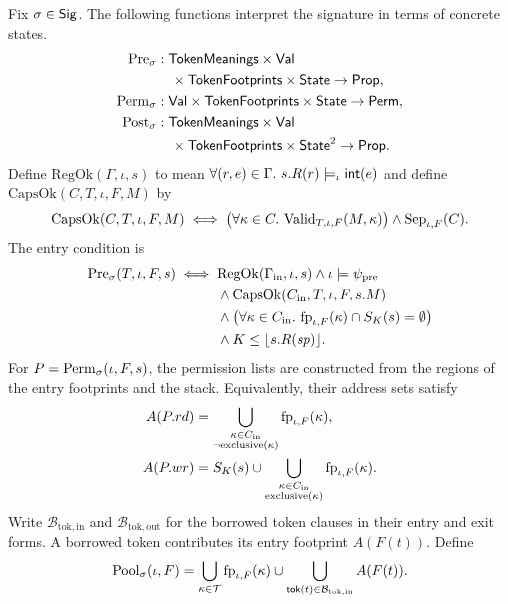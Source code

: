 \begin{definition}\label{def:prepost}
Fix $\sigma\in\mathsf{Sig}$. The following functions interpret the signature in terms of concrete states.
\[
\begin{aligned}
\mathrm{Pre}_\sigma&:\mathsf{TokenMeanings}\times\mathsf{Val}\\ &\quad\times\mathsf{TokenFootprints}\times\mathsf{State}\to\mathsf{Prop},\\
\mathrm{Perm}_\sigma&:\mathsf{Val}\times\mathsf{TokenFootprints}\times\mathsf{State}\to\mathsf{Perm},\\
\mathrm{Post}_\sigma&:\mathsf{TokenMeanings}\times\mathsf{Val}\\ &\quad\times\mathsf{TokenFootprints}\times\mathsf{State}^2\to\mathsf{Prop}.
\end{aligned}
\]
Define $\mathrm{RegOk}(\Gamma,\iota,s)$ to mean $\forall(r,e)\in\Gamma.\ s.R(r)\models_\iota\inttype{e}$ and define $\mathrm{CapsOk}(C,T,\iota,F,M)$ by
\[\mathrm{CapsOk}(C,T,\iota,F,M)\iff\big(\forall\kappa\in C.\ \mathrm{Valid}_{T,\iota,F}(M,\kappa)\big)\land\mathrm{Sep}_{\iota,F}(C).\]
The entry condition is
\[
\begin{aligned}
\Pre_\sigma(T,\iota,F,s)\iff{}&\mathrm{RegOk}(\Gamma_{\mathrm{in}},\iota,s)\land\iota\models\psi_{\mathrm{pre}}\\
&\land\mathrm{CapsOk}(C_{\mathrm{in}},T,\iota,F,s.M)\\
&\land\big(\forall\kappa\in C_{\mathrm{in}}.\ \fp_{\iota,F}(\kappa)\cap S_K(s)=\emptyset\big)\\
&\land K\le\un{s.R(\mathit{sp})}.
\end{aligned}
\]
For $P=\mathrm{Perm}_\sigma(\iota,F,s)$, the permission lists are constructed from the regions of the entry footprints and the stack. Equivalently, their address sets satisfy
\[
\begin{aligned}
A(P.rd)&=\bigcup_{\substack{\kappa\in C_{\mathrm{in}}\\\neg\mathrm{exclusive}(\kappa)}}\mathrm{fp}_{\iota,F}(\kappa),\\
A(P.wr)&=S_K(s)\cup\bigcup_{\substack{\kappa\in C_{\mathrm{in}}\\\mathrm{exclusive}(\kappa)}}\mathrm{fp}_{\iota,F}(\kappa).
\end{aligned}
\]
Write $\mathcal B_{\mathrm{tok,in}}$ and $\mathcal B_{\mathrm{tok,out}}$ for the borrowed token clauses in their entry and exit forms. A borrowed token contributes its entry footprint $A(F(t))$. Define
\[
\mathrm{Pool}_\sigma(\iota,F)=\bigcup_{\kappa\in\mathcal T}\mathrm{fp}_{\iota,F}(\kappa)\cup\bigcup_{\mathsf{tok}(t)\in\mathcal B_{\mathrm{tok,in}}}A(F(t)).
\]
\end{definition}
